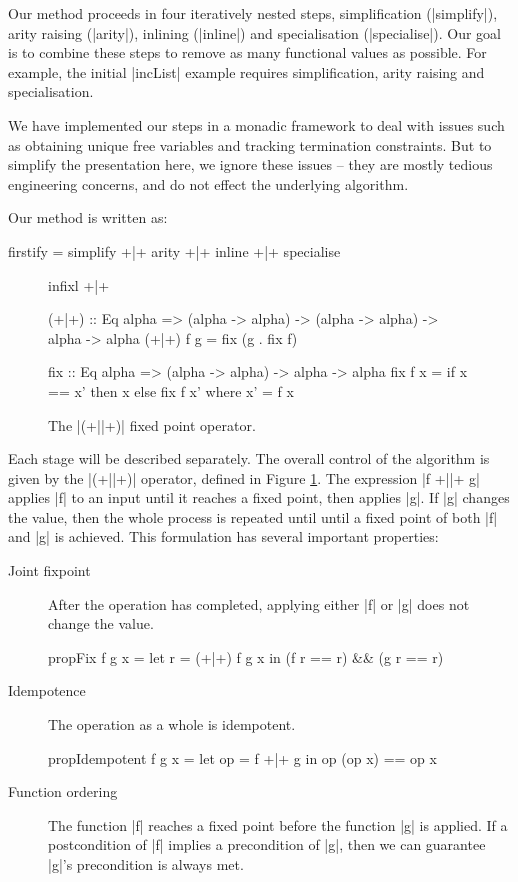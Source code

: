 Our method proceeds in four iteratively nested steps, simplification (|simplify|), arity raising (|arity|), inlining (|inline|) and specialisation (|specialise|). Our goal is to combine these steps to remove as many functional values as possible. For example, the initial |incList| example requires simplification, arity raising and specialisation.

We have implemented our steps in a monadic framework to deal with issues such as obtaining unique free variables and tracking termination constraints. But to simplify the presentation here, we ignore these issues -- they are mostly tedious engineering concerns, and do not effect the underlying algorithm.

Our method is written as:

\begin{code}
firstify = simplify +|+ arity +|+ inline +|+ specialise
\end{code}

\begin{figure}
\begin{code}
infixl +|+

(+|+) :: Eq alpha => (alpha -> alpha) -> (alpha -> alpha) -> alpha -> alpha
(+|+) f g = fix (g . fix f)

fix :: Eq alpha => (alpha -> alpha) -> alpha -> alpha
fix f x = if x == x' then x else fix f x'
    where x' = f x
\end{code}
\caption{The |(+||+)| fixed point operator.}
\label{figF:fixp_op}
\end{figure}

Each stage will be described separately. The overall control of the algorithm is given by the |(+||+)| operator, defined in Figure \ref{figF:fixp_op}. The expression |f +||+ g| applies |f| to an input until it reaches a fixed point, then applies |g|. If |g| changes the value, then the whole process is repeated until until a fixed point of both |f| and |g| is achieved. This formulation has several important properties:

\begin{description}
\item[Joint fixpoint] After the operation has completed, applying either |f| or |g| does not change the value.

\begin{code}
propFix f g x = let r = (+|+) f g x in (f r == r) && (g r == r)
\end{code}

\item[Idempotence] The operation as a whole is idempotent.

\begin{code}
propIdempotent f g x = let op = f +|+ g in op (op x) == op x
\end{code}

\item[Function ordering] The function |f| reaches a fixed point before the function |g| is applied. If a postcondition of |f| implies a precondition of |g|, then we can guarantee |g|'s precondition is always met.
\end{description}

